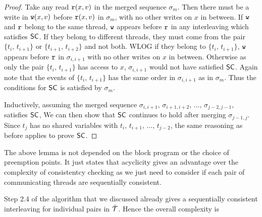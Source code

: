 \begin{proof}
Take any read $\mathtt{r}(x,v)$ in the merged sequence $\sigma_m$. Then there must be a write in $\mathtt{w}(x,v)$ before $\mathtt{r}(x,v)$ in $\sigma_m$, with no other writes on $x$ in between. If $\mathtt{w}$ and $\mathtt{r}$ belong to the same thread, $\mathtt{w}$ appears before $\mathtt{r}$ in any interleaving which satisfies $\mathsf{SC}$. If they belong to different threads, they must come from the pair $\{t_i,\, t_{i+1}\}$ or $\{t_{i+1},\, t_{i+2}\}$ and not both. WLOG if they belong to $\{t_i,\, t_{i+1}\}$, $\mathtt{w}$ appears before $\mathtt{r}$ in $\sigma_{{i},{i+1}}$ with no other writes on $x$ in between. Otherwise as only the pair $\{t_i,\, t_{i+1}\}$ has access to $x$, $\sigma_{{i},{i+1}}$ would not have satisfied $\mathsf{SC}$. Again note that the events of $\{t_i,\, t_{i+1}\}$ has the same order in $\sigma_{{i},{i+1}}$ as in $\sigma_m$. Thus the conditions for $\mathsf{SC}$ is satisfied by $\sigma_m$. 

Inductively, assuming the merged sequence $\sigma_{{i},{i+1}},\, \sigma_{{i+1},{i+2}},\, \dots,\, \sigma_{{j-2},{j-1}},$ satisfies $\mathsf{SC}$, We can then show that $\mathsf{SC}$ continues to hold after merging $\sigma_{{j-1},{j}}$. Since $t_{j}$ has no shared variables with $t_i,\, t_{i+1},\,\dots,\, t_{j-2}$, the same reasoning as before applies to prove $\mathsf{SC}$.

\end{proof}
\smallskip

The above lemma is not depended on the block program or the choice of preemption points. It just states that acyclicity gives an advantage over the complexity of consistentcy checking as we just need to  consider if each pair of communicating threads are sequentially consistent.

Step 2.4 of the algorithm that we discussed  already gives a sequentially consistent interleaving for individual pairs in $\bar{{\mathcal T}}$. Hence the overall complexity is 







